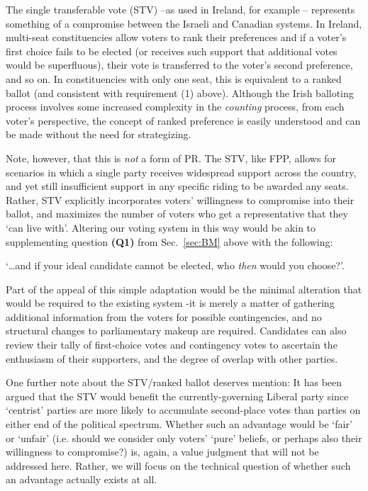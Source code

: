 \documentclass[DIV=calc, paper=a4, fontsize=11pt, twocolumn]{scrartcl}	 %
\begin{document}
The single transferable vote (STV) \---as used in Ireland, for example\cite{Irish_howto_vote_doc}
\--- represents something of a compromise between the Israeli and Canadian systems. In Ireland, multi-seat constituencies allow voters to  rank their preferences and if a voter's first choice fails to be elected (or receives such support that additional votes would be superfluous), their vote is transferred to the voter's second preference, and so on. In constituencies with only one seat, this is equivalent to a ranked ballot (and consistent with requirement (1) above). 
Although the Irish balloting process involves some increased complexity in the \emph{counting} process, from each voter's perspective, the concept of ranked preference is easily understood and can be made without the need for strategizing.

Note, however, that this is \emph{not} a form of PR. The STV, like FPP, allows for scenarios in which a single party receives widespread support across the country, and yet still insufficient support in any specific riding to be awarded any seats. 
Rather, STV explicitly incorporates voters' willingness to compromise into their ballot, and maximizes the number of voters who get a representative that they `can live with'.
Altering our voting system in this way would be akin to supplementing question \textbf{(Q1)} from Sec.~\ref{sec:BM} above with the following: 

\begin{tcolorbox}[colback=white!5!white,colframe=blue!55!black]
`\ldots and if your ideal candidate cannot be elected, who \emph{then} would you choose?'. 
\end{tcolorbox}

Part of the appeal of this simple adaptation would be the minimal alteration that would be required to the existing system \--it is merely a matter of gathering additional information from the voters for possible contingencies, and no structural changes to parliamentary makeup are required. Candidates can also review their tally of first-choice votes and contingency votes to ascertain the enthusiasm of their supporters, and the degree of overlap with other parties. 

One further note about the STV/ranked ballot deserves mention: It has been argued\cite{Record}
 that the STV would benefit the currently-governing Liberal party since  `centrist' parties are more likely to accumulate second-place votes than parties on either end of the political spectrum. 
Whether such an advantage would be `fair' or `unfair' (i.e. should we consider only voters' `pure' beliefs, or perhaps also their willingness to compromise?) is, again, a value judgment that will not be addressed here. Rather, we will focus on the technical question of whether such an advantage actually exists at all.
\end{document}

